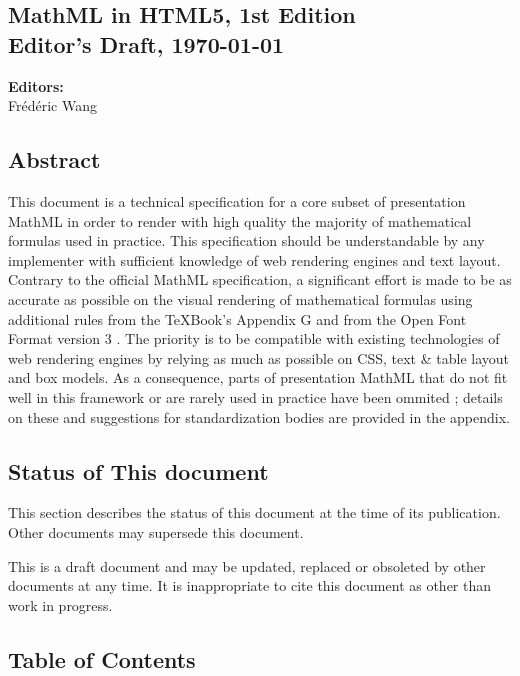 \subsection*{MathML in HTML5, 1st Edition \\Editor's Draft, \today}

\textbf{Editors:} \\
Frédéric Wang

\subsection*{Abstract}

This document is a technical specification for a core subset of presentation
MathML \cite{MathML3} in order to render with high quality the majority of
mathematical formulas used in practice.
This specification should be understandable by any implementer with
sufficient knowledge of web rendering engines and text layout.
Contrary to the official MathML specification, a significant effort is made to
be as accurate as possible on the visual rendering of mathematical formulas
using additional rules from the \TeX Book's Appendix G \cite{TeXBook} and from
the Open Font Format version 3 \cite{OpenFontFormat3}.
The priority is to be compatible with existing technologies of web
rendering engines \cite{HTML5} by relying as much as possible on CSS, text \&
table layout and box models. As a consequence, parts of presentation MathML
that do not fit well in this framework or are rarely used in practice
have been ommited ; details on these and suggestions for standardization bodies
are provided in the appendix.

\subsection*{Status of This document}

This section describes the status of this document at the time of its
publication. Other documents may supersede this document.

This is a draft document and may be updated, replaced or obsoleted by other
documents at any time. It is inappropriate to cite this document as other than
work in progress.

\subsection*{Table of Contents}

\renewcommand\contentsname{}
\tableofcontents
